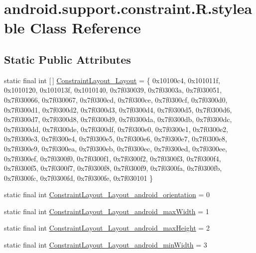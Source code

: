 \hypertarget{classandroid_1_1support_1_1constraint_1_1_r_1_1styleable}{}\section{android.\+support.\+constraint.\+R.\+styleable Class Reference}
\label{classandroid_1_1support_1_1constraint_1_1_r_1_1styleable}
\subsection*{Static Public Attributes}
\begin{DoxyCompactItemize}
\item 
static final int \mbox{[}$\,$\mbox{]} \mbox{\hyperlink{classandroid_1_1support_1_1constraint_1_1_r_1_1styleable_a96a3757da6f0c088e10cc55aa2a6ed9f}{Constraint\+Layout\+\_\+\+Layout}} = \{ 0x10100c4, 0x101011f, 0x1010120, 0x101013f, 0x1010140, 0x7f030039, 0x7f03003a, 0x7f030051, 0x7f030066, 0x7f030067, 0x7f0300cd, 0x7f0300ce, 0x7f0300cf, 0x7f0300d0, 0x7f0300d1, 0x7f0300d2, 0x7f0300d3, 0x7f0300d4, 0x7f0300d5, 0x7f0300d6, 0x7f0300d7, 0x7f0300d8, 0x7f0300d9, 0x7f0300da, 0x7f0300db, 0x7f0300dc, 0x7f0300dd, 0x7f0300de, 0x7f0300df, 0x7f0300e0, 0x7f0300e1, 0x7f0300e2, 0x7f0300e3, 0x7f0300e4, 0x7f0300e5, 0x7f0300e6, 0x7f0300e7, 0x7f0300e8, 0x7f0300e9, 0x7f0300ea, 0x7f0300eb, 0x7f0300ec, 0x7f0300ed, 0x7f0300ee, 0x7f0300ef, 0x7f0300f0, 0x7f0300f1, 0x7f0300f2, 0x7f0300f3, 0x7f0300f4, 0x7f0300f5, 0x7f0300f7, 0x7f0300f8, 0x7f0300f9, 0x7f0300fa, 0x7f0300fb, 0x7f0300fc, 0x7f0300fd, 0x7f0300fe, 0x7f030101 \}
\item 
static final int \mbox{\hyperlink{classandroid_1_1support_1_1constraint_1_1_r_1_1styleable_a36f52fed28919d0372e03cc70150f880}{Constraint\+Layout\+\_\+\+Layout\+\_\+android\+\_\+orientation}} = 0
\item 
static final int \mbox{\hyperlink{classandroid_1_1support_1_1constraint_1_1_r_1_1styleable_a325d89e861b9f5497a3232f571c40ec4}{Constraint\+Layout\+\_\+\+Layout\+\_\+android\+\_\+max\+Width}} = 1
\item 
static final int \mbox{\hyperlink{classandroid_1_1support_1_1constraint_1_1_r_1_1styleable_adf760fb5ee1563b2ba152b3fb0a72f81}{Constraint\+Layout\+\_\+\+Layout\+\_\+android\+\_\+max\+Height}} = 2
\item 
static final int \mbox{\hyperlink{classandroid_1_1support_1_1constraint_1_1_r_1_1styleable_a8ce686526634e93a8951dc1a3e160d80}{Constraint\+Layout\+\_\+\+Layout\+\_\+android\+\_\+min\+Width}} = 3

\end{DoxyCompactItemize}
